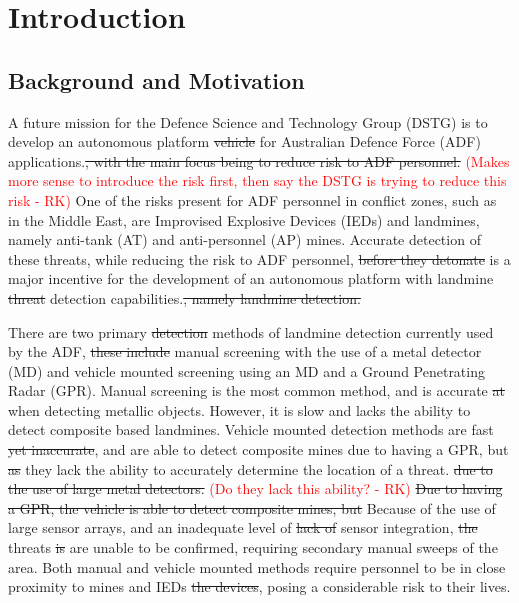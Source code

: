 \documentclass[main.tex]{subfiles}
\begin{document}

\chapter{Introduction}

\section{Background and Motivation}
A future mission for the Defence Science and Technology Group (DSTG) is to develop an autonomous platform \sout{vehicle} for Australian Defence Force (ADF) applications.\sout{, with the main focus being to reduce risk to ADF personnel.} 
\textcolor{red}{(Makes more sense to introduce the risk first, then say the DSTG is trying to reduce this risk - RK)} 
One of the risks present for ADF personnel in conflict zones, such as in the Middle East, are Improvised Explosive Devices (IEDs) and landmines, namely anti-tank (AT) and anti-personnel (AP) mines. Accurate detection of these threats, while reducing the risk to ADF personnel, \sout{before they detonate} is a major incentive for the development of an autonomous platform with landmine \sout{threat} detection capabilities.\sout{, namely landmine detection.}
\\
% 
% 
%
%
%

There are two primary \sout{detection} methods of landmine detection currently used by the ADF, \sout{these include} manual screening with the use of a metal detector (MD) and vehicle mounted screening using an MD and a Ground Penetrating Radar (GPR). Manual screening is the most common method, and is accurate \sout{at} when detecting metallic objects. However, it is slow and lacks the ability to detect composite based landmines. Vehicle mounted detection methods are fast \sout{yet inaccurate}, and are able to detect composite mines due to having a GPR, but \sout{as} they lack the ability to accurately determine the location of a threat. \sout{due to the use of large metal detectors.}
\textcolor{red}{(Do they lack this ability? - RK)}
\sout{Due to having a GPR, the vehicle is able to detect composite mines, but} Because of the use of large sensor arrays, and an inadequate level of \sout{lack of} sensor integration, \sout{the} threats \sout{is} are unable to be confirmed, requiring secondary manual sweeps of the area. Both manual and vehicle mounted methods require personnel to be in close proximity to mines and IEDs \sout{the devices}, posing a considerable risk to their lives. %
\\
%
%
\end{document}
